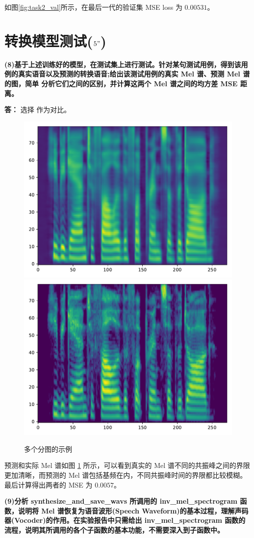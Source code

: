 \documentclass[degree=project,degree-type=project,cjk-font=noto]{thuthesis}
\begin{document}
如图\ref{fig:task2_val}所示，在最后一代的验证集 MSE loss 为 $0.00531$。


\section{转换模型测试($5"$)}

\textbf{(8)基于上述训练好的模型，在测试集上进行测试。针对某句测试用例，得到该用例的真实语音以及预测的转换语音;给出该测试用例的真实 Mel 谱、预测 Mel 谱的图，简单 分析它们之间的区别，并计算这两个 Mel 谱之间的均方差 MSE 距离。}

\textbf{答：}
选择  作为对比。

\begin{figure}
  \centering
    {\includegraphics[width=0.45\linewidth]{task2_predicted.pdf}}
    {\includegraphics[width=0.45\linewidth]{task2_ground.pdf}}
  \caption{多个分图的示例}
  \label{fig:task2_mel}
\end{figure}

预测和实际 Mel 谱如图 \ref{fig:task2_mel} 所示，可以看到真实的 Mel 谱不同的共振峰之间的界限更加清晰，而预测的 Mel 谱包括基频在内，不同共振峰时间的界限都比较模糊。
最后计算得出两者的 MSE 为 $0.0057$。

\textbf{(9)分析 synthesize\_and\_save\_wavs 所调用的 inv\_mel\_spectrogram 函数，说明将 Mel 谱恢复为语音波形(Speech Waveform)的基本过程，理解声码器(Vocoder)的作用。在实验报告中只需给出 inv\_mel\_spectrogram 函数的流程，说明其所调用的各个子函数的基本功能，不需要深入到子函数中。}
\end{document}
